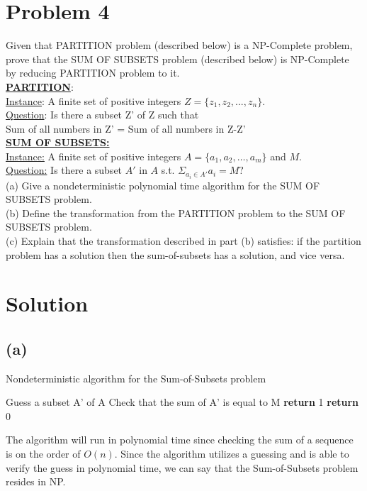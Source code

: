 
\section*{Problem 4}
	Given that PARTITION problem (described below) is a NP-Complete problem, prove that the SUM OF SUBSETS problem (described below) is NP-Complete by reducing PARTITION problem to it.\\
	
	\noindent
	\underline{\textbf{PARTITION}}:\\
	\underline{Instance}: A finite set of positive integers $Z = \{ z_1 , z_2 , ... , z_n \}$.\\
	\underline{Question}: Is there a subset Z' of Z such that\\
	Sum of all numbers in Z' = Sum of all numbers in Z-Z'\\
	
	\noindent
	\underline{\textbf{SUM OF SUBSETS:}}\\
	\underline{Instance:} A finite set of positive integers $A = \{a_1, a_2, \dots, a_m\}$ and $M$.\\
	\underline{Question:} Is there a subset $A'$ in $A$ s.t. $\Sigma_{a_i \in A'} a_i = M?$ \\
	
	\noindent
	(a) Give a nondeterministic polynomial time algorithm for the SUM OF SUBSETS problem.\\
	(b) Define the transformation from the PARTITION problem to the SUM OF SUBSETS problem.\\
	(c) Explain that the transformation described in part (b) satisfies: if the partition problem has a solution then the sum-of-subsets has a solution, and vice versa.
\section*{Solution}
	\subsection*{(a)}
		\begin{algorithm}[H]
			\caption{Nondeterministic algorithm for the Sum-of-Subsets problem}
			\begin{algorithmic}[1]
				\State Guess a subset A' of A
				\State Check that the sum of A' is equal to M
				\State \textbf{return} 1
				\Else 
				\State \textbf{return} 0
				\EndIf
			\end{algorithmic}
		\end{algorithm}
	The algorithm will run in polynomial time since checking the sum of a sequence is on the order of $O(n)$.
	Since the algorithm utilizes a guessing and is able to verify the guess in polynomial time, we can say that the Sum-of-Subsets problem resides in NP. 
